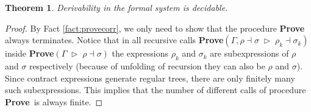 \documentclass[UKenglish]{eptcs}
\newtheorem{theorem}[definition]{Theorem}
\newcommand{\comply}{\dashv}
\newcommand{\complyF}{\comply}\newcommand{\altcomplyR}{\comply^{\mbox{\tiny $\blacktriangle$}}_{\mathsf a}}
\newcommand{\der}{\;\vartriangleright\;}
\newcommand{\Prove}{\textbf{Prove}}
\begin{document}
\begin{theorem}\label{the:a}
Derivability in the formal system is decidable.
\end{theorem}
\begin{proof}
 By Fact \ref{fact:provecorr}, we only need to show that the procedure \Prove\; always terminates. Notice that
in all recursive calls \Prove$(\Gamma, \rho\complyF\sigma \!\der\! \rho_k\complyF\sigma_k)$
inside
\Prove$(\Gamma\der \rho\complyF\sigma)$ the expressions $\rho_k$ and  $\sigma_k$ are subexpressions of $\rho$ and $\sigma$
respectively
(because of unfolding of recursion they can also be $\rho$ and $\sigma$). 
Since contract expressions generate regular trees, there are only finitely many such subexpressions. This implies that the number of different calls of procedure \Prove\ is always finite. 
\end{proof}
\end{document}

